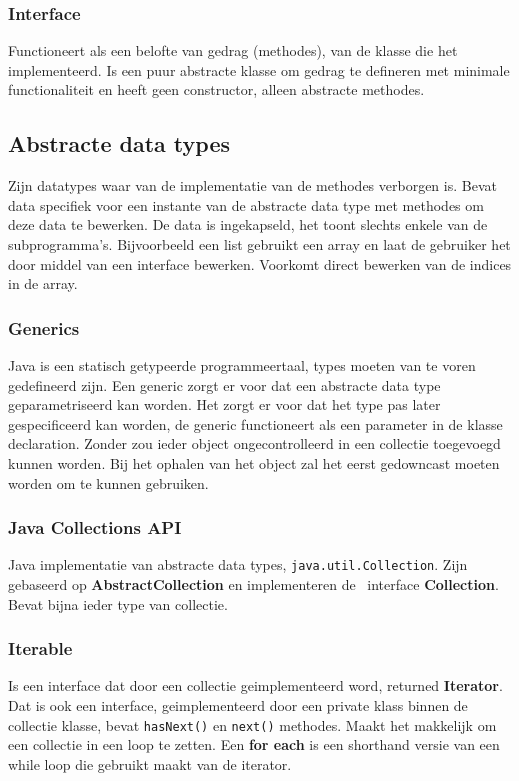 \subsubsection{Interface}
Functioneert als een belofte van gedrag (methodes), van de klasse die het implementeerd.
Is een puur abstracte klasse om gedrag te defineren met minimale functionaliteit en heeft geen constructor, alleen abstracte methodes.

\subsection{Abstracte data types}
Zijn datatypes waar van de implementatie van de methodes verborgen is.
Bevat data specifiek voor een instante van de abstracte data type met methodes om deze data te bewerken.
De data is ingekapseld, het toont slechts enkele van de subprogramma's.
Bijvoorbeeld een list gebruikt een array en laat de gebruiker het door middel van een interface bewerken.
Voorkomt direct bewerken van de indices in de array.

\subsubsection{Generics}
Java is een statisch getypeerde programmeertaal, types moeten van te voren gedefineerd zijn.
Een generic zorgt er voor dat een abstracte data type geparametriseerd kan worden.
Het zorgt er voor dat het type pas later gespecificeerd kan worden, de generic functioneert als een parameter in de klasse declaration.
Zonder zou ieder object ongecontrolleerd in een collectie toegevoegd kunnen worden.
Bij het ophalen van het object zal het eerst gedowncast moeten worden om te kunnen gebruiken.

\subsubsection{Java Collections API}
Java implementatie van abstracte data types, \texttt{java.util.Collection}.
Zijn gebaseerd op \textbf{AbstractCollection} en implementeren de \ interface \textbf{Collection}.
Bevat bijna ieder type van collectie.

\subsubsection{Iterable}
Is een interface dat door een collectie geimplementeerd word, returned \textbf{Iterator}.
Dat is ook een interface, geimplementeerd door een private klass binnen de collectie klasse, bevat \texttt{hasNext()} en \texttt{next()} methodes.
Maakt het makkelijk om een collectie in een loop te zetten.
Een \textbf{for each} is een shorthand versie van een while loop die gebruikt maakt van de iterator.

